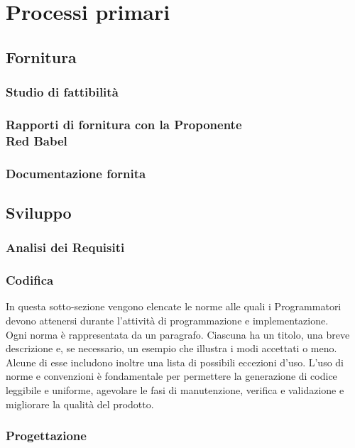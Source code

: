 \documentclass[NormeDiProgetto.tex]{subfiles}
\begin{document}
\chapter{Processi primari}

\section{Fornitura}
\subsection{Studio di fattibilità}
\subsection[Rapporti di fornitura con la Proponente Red Babel]{Rapporti di fornitura con la Proponente \\ Red Babel}
\subsection{Documentazione fornita}

\section{Sviluppo}
\subsection{Analisi dei Requisiti}
\subsection{Codifica}
In questa sotto-sezione vengono elencate le norme alle quali i Programmatori devono attenersi durante l'attività di programmazione e implementazione.\\
Ogni norma è rappresentata da un paragrafo. Ciascuna ha un titolo, una breve descrizione e, se necessario, un esempio che illustra i modi accettati o meno. Alcune di esse includono inoltre una lista di possibili eccezioni d'uso. L'uso di norme e convenzioni è fondamentale per permettere la generazione di codice leggibile e uniforme, agevolare le fasi di manutenzione, verifica e validazione e migliorare la qualità del prodotto.





\subsection{Progettazione}
\end{document}
